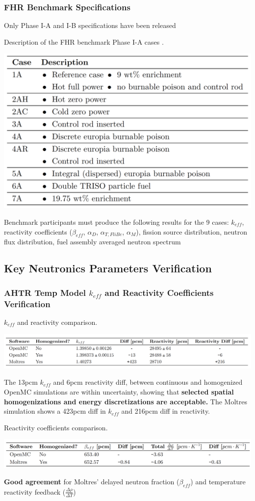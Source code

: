 \begin{frame}
    \frametitle{FHR Benchmark Specifications}
    Only Phase I-A and I-B specifications have been released 
    \begin{table}
        \caption{Description of the \acrlong{FHR} benchmark Phase I-A cases 
        \vspace{-0.25cm}
        \cite{petrovic_benchmark_2021}.}
        \includegraphics[width=0.6\linewidth]{figures/benchmark-cases.png} 
    \end{table}
    Benchmark participants must produce the following results for 
    the 9 cases: $k_{eff}$, reactivity coefficients ($\beta_{eff}$, 
    $\alpha_D$, $\alpha_{T, FliBe}$, $\alpha_M$), fission source distribution, 
    neutron flux distribution, fuel assembly averaged neutron spectrum
\end{frame}

\subsection*{Key Neutronics Parameters Verification}
\begin{frame}
    \frametitle{AHTR Temp Model $k_{eff}$ and Reactivity Coefficients Verification}
        \begin{table}
            \caption{$k_{eff}$ and reactivity comparison.}
            \vspace{-0.2cm}
            \includegraphics[width=0.9\linewidth]{figures/benchmark-keff.png}
        \end{table}
        The 13pcm $k_{eff}$ and 6pcm reactivity diff, between
        continuous and homogenized OpenMC simulations are within uncertainty, showing 
        that \textbf{selected spatial homogenizations and energy discretizations are 
        acceptable.}
        The Moltres simulation shows a 423pcm diff in $k_{eff}$ and 216pcm 
        diff in reactivity.
        \begin{table}
            \caption{Reactivity coefficients comparison.}
            \includegraphics[width=0.85\linewidth]{figures/benchmark-coeff.png}
        \end{table}
        \textbf{Good agreement} for Moltres' delayed neutron fraction ($\beta_{eff}$) and 
        temperature reactivity feedback ($\frac{\Delta \rho}{\Delta T}$)
\end{frame}

